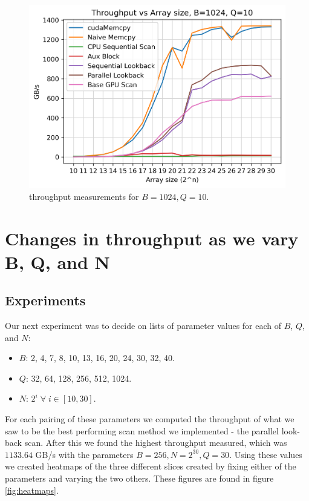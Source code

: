 \documentclass[twocolumn]{article}
\begin{document}
\begin{figure}[h]
    \centering
    \includegraphics[width=\linewidth]{report/plots/throughput_vs_array_size_B1024_Q10.png}
    \caption{throughput measurements for $B=1024,Q=10$.}
    \label{fig:plot_1024_10}
\end{figure}

\section{Changes in throughput as we vary B, Q, and N}
\subsection{Experiments}
Our next experiment was to decide on lists of parameter values for each of $B$, $Q$, and $N$:
\begin{itemize}
    \item $B$: 2, 4, 7, 8, 10, 13, 16, 20, 24, 30, 32, 40.
    \item $Q$: 32, 64, 128, 256, 512, 1024.
    \item $N$: $2^i \; \forall \; i \in [10,30]$.
\end{itemize}
For each pairing of these parameters we computed the throughput of what we saw to be the best performing scan method we implemented - the parallel look-back scan. After this we found the highest throughput measured, which was $1133.64$ GB/s with the parameters $B=256,N=2^{30},Q=30$. Using these values we created heatmaps of the three different slices created by fixing either of the parameters and varying the two others. These figures are found in figure \ref{fig:heatmaps}.
\end{document}
